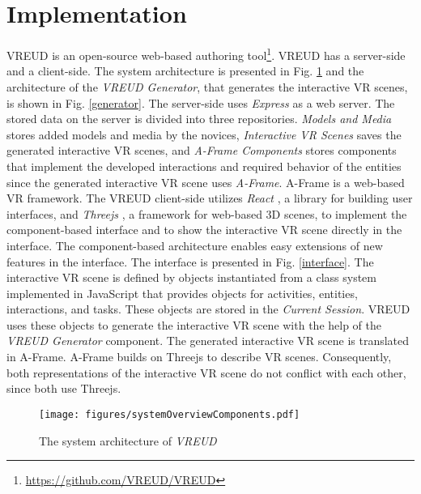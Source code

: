 \documentclass[conference]{IEEEtran}
\begin{document}
\section{Implementation}
VREUD is an open-source web-based authoring tool\footnote{\url{https://github.com/VREUD/VREUD}}. VREUD has a server-side and a client-side. The system architecture is presented in Fig. \ref{architecture} and the architecture of the \textit{VREUD Generator}, that generates the interactive VR scenes, is shown in Fig. \ref{generator}. The server-side uses \textit{Express} \cite{Express} as a web server. The stored data on the server is divided into three repositories. \textit{Models and Media} stores added models and media by the novices, \textit{Interactive VR Scenes} saves the generated interactive VR scenes, and \textit{A-Frame Components} stores components that implement the developed interactions and required behavior of the entities since the generated interactive VR scene uses \textit{A-Frame}\cite{AFrameWebpage}. A-Frame is a web-based VR framework. The VREUD client-side utilizes \textit{React} \cite{ReactWebpage}, a library for building user interfaces, and \textit{Threejs} \cite{ThreejsWebpage}, a framework for web-based 3D scenes, to implement the component-based interface and to show the interactive VR scene directly in the interface. The component-based architecture enables easy extensions of new features in the interface. The interface is presented in Fig. \ref{interface}. The interactive VR scene is defined by objects instantiated from a class system implemented in JavaScript that provides objects for activities, entities, interactions, and tasks. These objects are stored in the \textit{Current Session}. VREUD uses these objects to generate the interactive \ac{VR} scene with the help of the \textit{VREUD Generator} component. The generated interactive \ac{VR} scene is translated in A-Frame. A-Frame builds on Threejs to describe VR scenes. Consequently, both representations of the interactive \ac{VR} scene do not conflict with each other, since both use Threejs.
\begin{figure}[htbp]
\centerline{\texttt{[image: figures/systemOverviewComponents.pdf]}}
\caption{The system architecture of \textit{VREUD}}
\label{architecture}
\end{figure}
\end{document}
